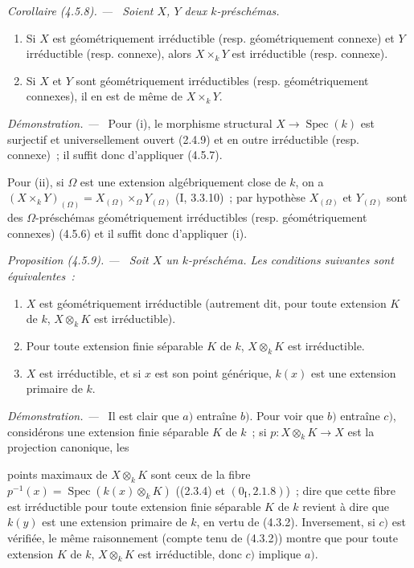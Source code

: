 \documentclass[10pt,oneside]{book}
\newcommand{\oldpage}[2][]{%
  \setcounter{footnote}{0}%
  \marginpar{\scriptsize\textbf{#1}~|~#2}\ignorespaces}
\newenvironment{proposition}[1][]{%
  \par\medskip\noindent\itshape Proposition (#1). ---\ }{\par}
\newenvironment{corollary}[1][]{%
  \par\medskip\noindent\itshape Corollaire (#1). ---\ }{\par}
\newenvironment{proof}{%
  \par\medskip\noindent\textit{Démonstration. ---\ }}{\par}
\begin{document}
\begin{corollary}[4.5.8]
\label{IV.2.4.5.8-fr}
Soient $X$, $Y$ deux $k$-préschémas.
\begin{enumerate}
\item[(i)] Si $X$ est géométriquement irréductible (resp. géométriquement
connexe) et $Y$ irréductible (resp. connexe), alors $X\times_k Y$ est
irréductible (resp. connexe).
\item[(ii)] Si $X$ et $Y$ sont géométriquement irréductibles (resp.
géométriquement connexes), il en est de même de $X\times_k Y$.
\end{enumerate}
\end{corollary}

\begin{proof}
Pour (i), le morphisme structural $X\to\operatorname{Spec}(k)$ est surjectif et
universellement ouvert (2.4.9) et en outre irréductible (resp. connexe)~; il
suffit donc d'appliquer (4.5.7).

Pour (ii), si $\Omega$ est une extension algébriquement close de $k$, on a
$(X\times_k Y)_{(\Omega)}=X_{(\Omega)}\times_\Omega Y_{(\Omega)}$
(I, 3.3.10)~; par hypothèse $X_{(\Omega)}$ et $Y_{(\Omega)}$ sont des
$\Omega$-préschémas géométriquement irréductibles (resp. géométriquement
connexes) (4.5.6) et il suffit donc d'appliquer (i).
\end{proof}

\begin{proposition}[4.5.9]
\label{IV.2.4.5.9-fr}
Soit $X$ un $k$-préschéma. Les conditions suivantes sont équivalentes~:
\begin{enumerate}
\item[$a)$] $X$ est géométriquement irréductible (autrement dit, pour toute
extension $K$ de $k$, $X\otimes_k K$ est irréductible).
\item[$b)$] Pour toute extension finie séparable $K$ de $k$, $X\otimes_k K$
est irréductible.
\item[$c)$] $X$ est irréductible, et si $x$ est son point générique, $k(x)$
est une extension primaire de $k$.
\end{enumerate}
\end{proposition}

\begin{proof}
Il est clair que $a)$ entraîne $b)$. Pour voir que $b)$ entraîne $c)$,
considérons une extension finie séparable $K$ de $k$~; si
$p:X\otimes_k K\to X$ est la projection canonique, les

\oldpage[IV-2]{63}

points maximaux de $X\otimes_k K$ sont ceux de la fibre
$p^{-1}(x)=\operatorname{Spec}(k(x)\otimes_k K)$ ((2.3.4) et
$(0_{\mathrm I},2.1.8)$)~; dire que cette fibre est irréductible pour toute
extension finie séparable $K$ de $k$ revient à dire que $k(y)$ est une
extension primaire de $k$, en vertu de (4.3.2). Inversement, si $c)$ est
vérifiée, le même raisonnement (compte tenu de (4.3.2)) montre que pour toute
extension $K$ de $k$, $X\otimes_k K$ est irréductible, donc $c)$ implique
$a)$.
\end{proof}
\end{document}
